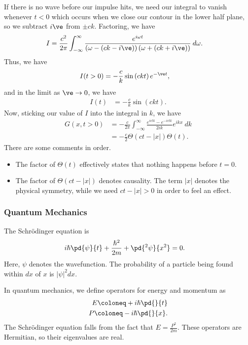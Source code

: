 \documentclass[10pt]{mypackage}
\renewcommand*{\hbar}{\hslash}
\begin{document}
  If there is no wave before our impulse hits, we need our integral to vanish whenever $t < 0$ which occurs when we close our contour in the lower half plane, so we subtract $i\ve$ from $\pm ck$. Factoring, we have
  \begin{align*}
    I &= \frac{c^2}{2\pi}\int_{-\infty}^{\infty} \frac{e^{i\omega t}}{\left( \omega-\left( ck-i\ve \right) \right)\left( \omega+\left( ck + i\ve\right) \right)}\:d\omega.
  \end{align*}
  Thus, we have
  \begin{align*}
    I(t > 0) &= -\frac{c}{k}\sin\left( ckt \right)e^{-\ve t},
  \end{align*}
  and in the limit as $\ve\rightarrow 0$, we have
  \begin{align*}
    I(t) &= -\frac{c}{k}\sin\left( ckt \right).
  \end{align*}
  Now, sticking our value of $I$ into the integral in $k$, we have
  \begin{align*}
    G\left( x, t> 0 \right) &= -\frac{c}{2\pi} \int_{-\infty}^{\infty} \frac{e^{ictk} - e^{-ictk}}{2ik}e^{ikx}\:dk\\
                            &= -\frac{c}{2}\Theta\left( ct-\left\vert x \right\vert \right)\Theta\left( t \right).
  \end{align*}
  There are some comments in order.
  \begin{itemize}
    \item The factor of $\Theta\left(t\right)$ effectively states that nothing happens before $t = 0$.
    \item The factor of $\Theta\left( ct - \left\vert x \right\vert \right)$ denotes causality. The term $\left\vert x \right\vert$ denotes the physical symmetry, while we need $ct - \left\vert x \right\vert > 0$ in order to feel an effect.
  \end{itemize}
  \subsubsection{Quantum Mechanics}%
  The Schrödinger equation is
  \begin{align*}
    i \hbar \pd{\psi}{t} + \frac{\hbar^2}{2m} + \pd{^2\psi}{x^2} &= 0.
  \end{align*}
  Here, $\psi$ denotes the wavefunction. The probability of a particle being found within $dx$ of $x$ is $\left\vert \psi \right\vert^2dx$.\newline

  In quantum mechanics, we define operators for energy and momentum as
  \begin{align*}
    E\coloneq +i\hbar \pd{}{t}\\
    P \coloneq -i\hbar \pd{}{x}.
  \end{align*}
  The Schrödinger equation falls from the fact that $E = \frac{P^2}{2m}$. These operators are Hermitian, so their eigenvalues are real.\newline
\end{document}
